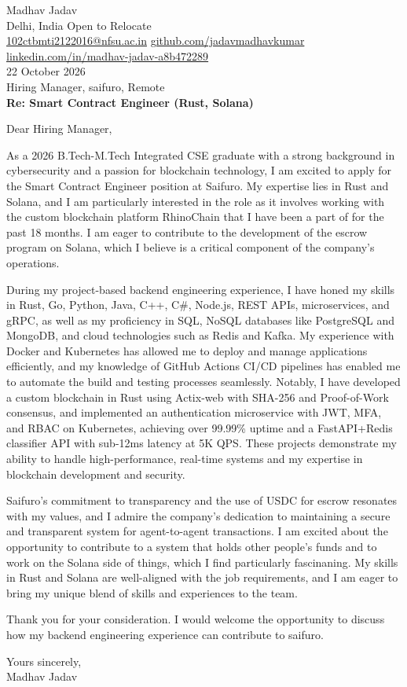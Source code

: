 \documentclass[10pt,letterpaper]{article}
\begin{document}
\begin{flushleft}
Madhav Jadav\\
Delhi, India \textbar{} Open to Relocate\\
\href{mailto:102ctbmti2122016@nfsu.ac.in}{102ctbmti2122016@nfsu.ac.in} \textbar{} \href{https://github.com/jadavmadhavkumar}{github.com/jadavmadhavkumar} \textbar{} \href{https://www.linkedin.com/in/madhav-jadav-a8b472289}{linkedin.com/in/madhav-jadav-a8b472289}\\[8pt]
22 October 2026\\[4pt]
Hiring Manager, saifuro, Remote\\[8pt]
\textbf{Re: Smart Contract Engineer (Rust, Solana)}\\[8pt]
\end{flushleft}
Dear Hiring Manager,

As a 2026 B.Tech-M.Tech Integrated CSE graduate with a strong background in cybersecurity and a passion for blockchain technology, I am excited to apply for the Smart Contract Engineer position at Saifuro. My expertise lies in Rust and Solana, and I am particularly interested in the role as it involves working with the custom blockchain platform RhinoChain that I have been a part of for the past 18 months. I am eager to contribute to the development of the escrow program on Solana, which I believe is a critical component of the company's operations.

During my project-based backend engineering experience, I have honed my skills in Rust, Go, Python, Java, C++, C\#, Node.js, REST APIs, microservices, and gRPC, as well as my proficiency in SQL, NoSQL databases like PostgreSQL and MongoDB, and cloud technologies such as Redis and Kafka. My experience with Docker and Kubernetes has allowed me to deploy and manage applications efficiently, and my knowledge of GitHub Actions CI/CD pipelines has enabled me to automate the build and testing processes seamlessly. Notably, I have developed a custom blockchain in Rust using Actix-web with SHA-256 and Proof-of-Work consensus, and implemented an authentication microservice with JWT, MFA, and RBAC on Kubernetes, achieving over 99.99\% uptime and a FastAPI+Redis classifier API with sub-12ms latency at 5K QPS. These projects demonstrate my ability to handle high-performance, real-time systems and my expertise in blockchain development and security.

Saifuro's commitment to transparency and the use of USDC for escrow resonates with my values, and I admire the company's dedication to maintaining a secure and transparent system for agent-to-agent transactions. I am excited about the opportunity to contribute to a system that holds other people's funds and to work on the Solana side of things, which I find particularly fascinaning. My skills in Rust and Solana are well-aligned with the job requirements, and I am eager to bring my unique blend of skills and experiences to the team.

Thank you for your consideration. I would welcome the opportunity to discuss how my backend engineering experience can contribute to saifuro.

Yours sincerely,\\[8pt]
Madhav Jadav
\end{document}
